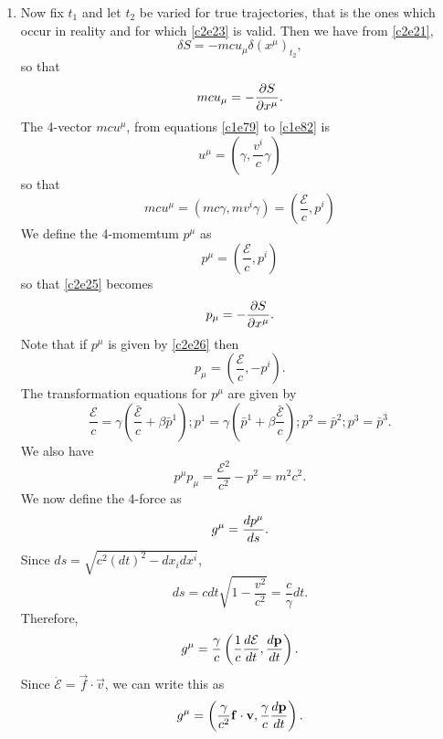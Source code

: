 \begin{enumerate}
\item Now fix $t_1$ and let $t_2$ be varied for true trajectories, that is the
ones which occur in reality and for which \eqref{c2e23} is valid. Then we have 
from
\eqref{c2e21},
\begin{equation}\label{c2e24}
\delta S = -mcu_\mu \delta (x^\mu)_{t_2},
\end{equation}
so that
\begin{equation}\label{c2e25}
mcu_\mu = -\frac{\partial{S}}{\partial{x^\mu}}.
\end{equation}
The 4-vector $mcu^\mu$, from equations \eqref{c1e79} to \eqref{c1e82} is
\[
u^\mu = \left(\gamma, \frac{v^i}{c}\gamma\right)
\]
so that
\[
mcu^\mu = \left(mc\gamma, mv^i\gamma\right) = \left(\frac{\mathcal{E}}{c}, p^i\right)
\]
We define the 4-momemtum $p^\mu$ as
\begin{equation}\label{c2e26}
p^\mu = \left(\frac{\mathcal{E}}{c}, p^i\right)
\end{equation}
so that \eqref{c2e25} becomes
\begin{equation}\label{c2e27}
p_\mu = -\frac{\partial{S}}{\partial{x^\mu}}.
\end{equation}
Note that if $p^\mu$ is given by \eqref{c2e26} then
\begin{equation}\label{c2e28}
p_\mu = \left(\frac{\mathcal{E}}{c}, -p^i\right).
\end{equation}
The transformation equations for $p^\mu$ are given by
\begin{equation}\label{c2e29}
\frac{\mathcal{E}}{c} = \gamma\left(\frac{\bar{\mathcal{E}}}{c} + \beta\bar{p}^1\right);
p^1 = \gamma\left(\bar{p}^1 + \beta\frac{\bar{\mathcal{E}}}{c}\right); p^2 = \bar{p}^2;
p^3 = \bar{p}^3.
\end{equation}
We also have
\begin{equation}\label{c2e30}
p^\mu p_\mu = \frac{\mathcal{E}^2}{c^2} - p^2 = m^2c^2.
\end{equation}
We now define the 4-force as 
\begin{equation}\label{c2e31}
g^\mu = \frac{d{p^\mu}}{d{s}}.
\end{equation}
Since $ds = \sqrt{c^2(dt)^2 - dx_i dx^i}$,
\begin{equation}\label{c2e32}
ds = cdt\sqrt{1 - \frac{v^2}{c^2}} = \frac{c}{\gamma}dt.
\end{equation}
Therefore,
\[
g^\mu = \frac{\gamma}{c}\left(\frac{1}{c}\frac{d{\mathcal{E}}}{d{t}}, \frac{d{\mathbf{p}}}{d{t}}\right).
\]
Since $\dot{\mathcal{E}} = \vec{f}\cdot\vec{v}$, we can write this as
\begin{equation}\label{c2e33}
g^\mu = \left(\frac{\gamma}{c^2}\mathbf{f}\cdot\mathbf{v}, \frac{\gamma}{c}\frac{d{\mathbf{p}}}{d{t}}\right).
\end{equation}


\end{enumerate}
